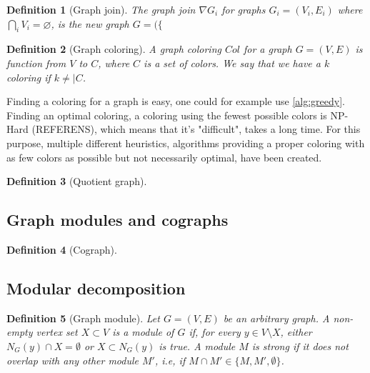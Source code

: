 \documentclass{amsart}
\newtheorem{definition}{Definition}[section]
\begin{document}
\begin{definition}[Graph join]
    The graph join $\nabla G_i$ for graphs $G_i = (V_i,E_i)$ where 
    $\bigcap_i V_i = \varnothing$, is the new graph $G = (\{ $
\end{definition}


\begin{definition}[Graph coloring]
    A graph coloring $Col$ for a graph $G = (V,E)$
    is function from $V$ to $C$, where $C$ is a set of colors. We say that 
    we have a $k$ coloring if $k \neq |C$.
\end{definition}

Finding a coloring for a graph is easy, one could for example use 
\autoref{alg:greedy}. Finding an optimal coloring, a coloring using the fewest
possible colors is NP-Hard (REFERENS), which means that it's "difficult", takes
a long time. For this purpose, multiple different heuristics, algorithms
providing a proper coloring with as few colors as possible but not necessarily
optimal, have been created.

\begin{definition}[Quotient graph]

\end{definition}

\subsection{Graph modules and cographs}
\label{sec:GraphModules}

\begin{definition}[Cograph]
    
\end{definition}

\subsection{Modular decomposition}

\begin{definition}[Graph module]
    Let $G = (V,E)$ be an arbitrary graph. A non-empty vertex set $X \subset V$
    is a module of $G$ if, for every $y \in V \setminus X$,  either
    $N_G(y) \cap X = \emptyset$ or $X \subset N_G(y)$ is true. A module $M$ is
    strong if it does not overlap with any other module $M'$, i.e, if 
    $M \cap M' \in \{M,M',\emptyset \}$.
\end{definition}
   
\end{document}
